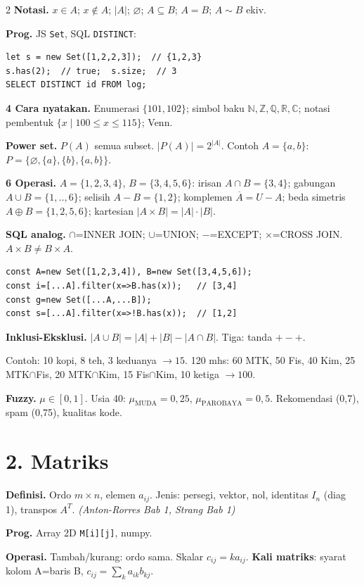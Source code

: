 \documentclass[8pt,a4paper]{extarticle}
\newcommand{\h}[1]{\textbf{#1}}
\newcommand{\src}[1]{\textit{(#1)}}
\begin{document}
\begin{multicols*}{2}
	\h{Notasi.} $x\in A$; $x\notin A$; $|A|$; $\varnothing$; $A\subseteq B$; $A{=}B$; $A{\sim}B$ ekiv.

	\h{Prog.} JS \texttt{Set}, SQL \texttt{DISTINCT}:
	\begin{lstlisting}
let s = new Set([1,2,2,3]);  // {1,2,3}
s.has(2);  // true;  s.size;  // 3
SELECT DISTINCT id FROM log;
\end{lstlisting}

	\h{4 Cara nyatakan.} Enumerasi $\{101,102\}$; simbol baku $\mathbb{N,Z,Q,R,C}$; notasi pembentuk $\{x\mid 100\le x\le 115\}$; Venn.

	\h{Power set.} $P(A)$ semua subset. $|P(A)|{=}2^{|A|}$. Contoh $A{=}\{a,b\}$: $P{=}\{\varnothing,\{a\},\{b\},\{a,b\}\}$.

	\h{6 Operasi.} $A{=}\{1,2,3,4\}$, $B{=}\{3,4,5,6\}$: irisan $A\cap B{=}\{3,4\}$; gabungan $A\cup B{=}\{1,..,6\}$; selisih $A{-}B{=}\{1,2\}$; komplemen $\overline{A}{=}U{-}A$; beda simetris $A\oplus B{=}\{1,2,5,6\}$; kartesian $|A\times B|{=}|A|\cdot|B|$.

	\h{SQL analog.} $\cap$=INNER JOIN; $\cup$=UNION; ${-}$=EXCEPT; $\times$=CROSS JOIN. $A\times B\neq B\times A$.

	\begin{lstlisting}
const A=new Set([1,2,3,4]), B=new Set([3,4,5,6]);
const i=[...A].filter(x=>B.has(x));   // [3,4]
const g=new Set([...A,...B]);
const s=[...A].filter(x=>!B.has(x));  // [1,2]
\end{lstlisting}

	\h{Inklusi-Eksklusi.} $|A\cup B|{=}|A|{+}|B|{-}|A\cap B|$. Tiga: tanda $+{-}+$.

	Contoh: 10 kopi, 8 teh, 3 keduanya $\to15$. 120 mhs: 60 MTK, 50 Fis, 40 Kim, 25 MTK$\cap$Fis, 20 MTK$\cap$Kim, 15 Fis$\cap$Kim, 10 ketiga $\to100$.

	\h{Fuzzy.} $\mu\in[0,1]$. Usia 40: $\mu_\text{MUDA}{=}0{,}25$, $\mu_\text{PAROBAYA}{=}0{,}5$. Rekomendasi (0,7), spam (0,75), kualitas kode.

	\section*{2. Matriks}

	\h{Definisi.} Ordo $m\times n$, elemen $a_{ij}$. Jenis: persegi, vektor, nol, identitas $I_n$ (diag 1), transpos $A^T$. \src{Anton-Rorres Bab 1, Strang Bab 1}

	\h{Prog.} Array 2D \texttt{M[i][j]}, numpy.

	\h{Operasi.} Tambah/kurang: ordo sama. Skalar $c_{ij}{=}ka_{ij}$. \h{Kali matriks}: syarat kolom A=baris B, $c_{ij}{=}\sum_k a_{ik}b_{kj}$.


\end{multicols*}
\end{document}
